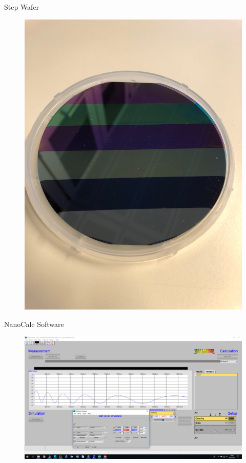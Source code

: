 \documentclass[10pt]{beamer}
\begin{document}
\begin{frame}{Step Wafer}
	\begin{figure}
	\centering
	\includegraphics[scale=0.06,angle=-90]{stepwafer.JPG}
	\end{figure}
\end{frame}
	
	
\begin{frame}{NanoCalc Software}
	\begin{figure}
		\includegraphics[width=\textwidth]{nanocalc.png}
	\end{figure}
\end{frame}
\end{document}
